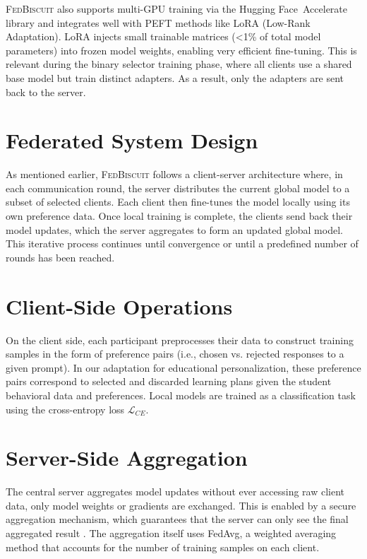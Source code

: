 \textsc{FedBiscuit} also supports multi-GPU training via the Hugging Face Accelerate library \cite{accelerate} and integrates well with PEFT methods like LoRA (Low-Rank Adaptation)\cite{hu2021loralowrankadaptationlarge}. LoRA  injects small trainable matrices (<1\% of total model parameters) into frozen model weights, enabling very efficient fine-tuning. This is relevant during the binary selector training phase, where all clients use a shared base model but train distinct adapters. As a result, only the adapters are sent back to the server.

\section{Federated System Design} 
As mentioned earlier, \textsc{FedBiscuit} follows a client-server architecture where, in each communication round, the server distributes the current global model to a subset of selected clients. Each client then fine-tunes the model locally using its own preference data. Once local training is complete, the clients send back their model updates, which the server aggregates to form an updated global model. This iterative process continues until convergence or until a predefined number of rounds has been reached.

\section{Client-Side Operations} 
On the client side, each participant preprocesses their data to construct training samples in the form of preference pairs (i.e., chosen vs. rejected responses to a given prompt). In our adaptation for educational personalization, these preference pairs correspond to selected and discarded learning plans given the student behavioral data and preferences. Local models are trained as a classification task using the cross-entropy loss $\mathcal{L}_{CE}$.

\section{Server-Side Aggregation} 
The central server aggregates model updates without ever accessing raw client data, only model weights or gradients are exchanged. This is enabled by a secure aggregation mechanism, which guarantees that the server can only see the final aggregated result \cite{bonawitz2016practicalsecureaggregationfederated}. The aggregation itself uses FedAvg, a weighted averaging method that accounts for the number of training samples on each client. 


